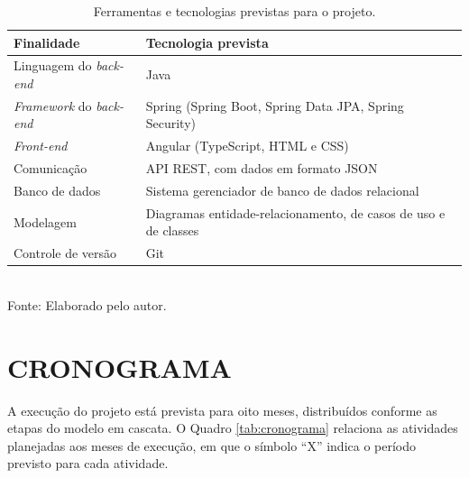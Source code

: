 \documentclass[
        oneside,      %
        english,			
        brazil			 
        ]{abntspiifac}
\begin{document}
\begin{table}[!htb]
\centering
\caption{Ferramentas e tecnologias previstas para o projeto.}
\label{tab:tecnologias}
\footnotesize
\begin{tabular}{>{\raggedright}p{4.5cm} p{8cm}}
\toprule
\textbf{Finalidade} & \textbf{Tecnologia prevista} \\
\midrule
Linguagem do \textit{back-end} & Java \\
\textit{Framework} do \textit{back-end} & Spring (Spring Boot, Spring Data JPA, Spring Security) \\
\textit{Front-end} & Angular (TypeScript, HTML e CSS) \\
Comunicação & API REST, com dados em formato JSON \\
Banco de dados & Sistema gerenciador de banco de dados relacional \\
Modelagem & Diagramas entidade-relacionamento, de casos de uso e de classes \\
Controle de versão & Git \\
\bottomrule
\end{tabular}\\
{\footnotesize Fonte: Elaborado pelo autor.}
\end{table}


\chapter{CRONOGRAMA}

A execução do projeto está prevista para oito meses, distribuídos conforme as etapas do modelo em cascata. O Quadro \ref{tab:cronograma} relaciona as atividades planejadas aos meses de execução, em que o símbolo ``X'' indica o período previsto para cada atividade.
\end{document}
